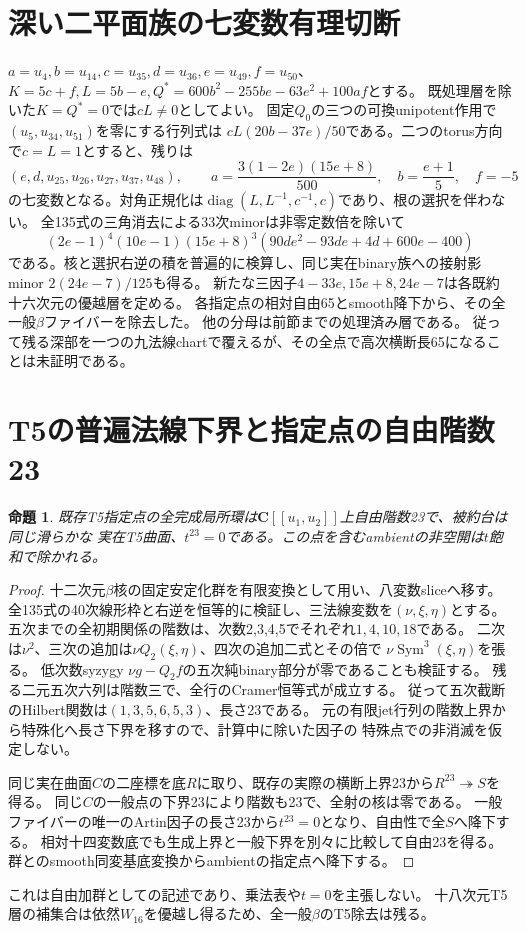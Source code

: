 \documentclass[11pt,a4paper]{ltjsarticle}
\newcommand{\CC}{\mathbf C}
\newtheorem{proposition}[theorem]{命題}
\theoremstyle{remark}
\begin{document}
\section{深い二平面族の七変数有理切断}
$a=u_4,b=u_{14},c=u_{35},d=u_{36},e=u_{49},f=u_{50}$、
$K=5c+f,L=5b-e,Q^*=600b^2-255be-63e^2+100af$とする。
既処理層を除いた$K=Q^*=0$では$cL\ne0$としてよい。
固定$Q_0$の三つの可換unipotent作用で$(u_5,u_{34},u_{51})$を零にする行列式は
$cL(20b-37e)/50$である。二つのtorus方向で$c=L=1$とすると、残りは
\[
 (e,d,u_{25},u_{26},u_{27},u_{37},u_{48}),\qquad
 a=\frac{3(1-2e)(15e+8)}{500},\quad b=\frac{e+1}{5},\quad f=-5
\]
の七変数となる。対角正規化は$\operatorname{diag}(L,L^{-1},c^{-1},c)$であり、根の選択を伴わない。
全135式の三角消去による33次minorは非零定数倍を除いて
\[
 (2e-1)^4(10e-1)(15e+8)^3
 (90de^2-93de+4d+600e-400)
\]
である。核と選択右逆の積を普遍的に検算し、同じ実在binary族への接射影minor
$2(24e-7)/125$も得る。
新たな三因子$4-33e,15e+8,24e-7$は各既約十六次元の優越層を定める。
各指定点の相対自由65とsmooth降下から、その全一般$\beta$ファイバーを除去した。
他の分母は前節までの処理済み層である\cite{deeper-chart-v42}。
従って残る深部を一つの九法線chartで覆えるが、その全点で高次横断長65になることは未証明である。

\newpage
\section{T5の普遍法線下界と指定点の自由階数23}
\begin{proposition}
既存T5指定点の全完成局所環は$\CC[[u_1,u_2]]$上自由階数23で、被約台は同じ滑らかな
実在T5曲面、$t^{23}=0$である。この点を含むambientの非空開は$t$飽和で除かれる。
\end{proposition}
\begin{proof}
十二次元$\beta$核の固定安定化群を有限変換として用い、八変数sliceへ移す。
全135式の40次線形枠と右逆を恒等的に検証し、三法線変数を$(\nu,\xi,\eta)$とする。
五次までの全初期関係の階数は、次数2,3,4,5でそれぞれ$1,4,10,18$である。
二次は$\nu^2$、三次の追加は$\nu Q_2(\xi,\eta)$、四次の追加二式とその倍で
$\nu\operatorname{Sym}^3(\xi,\eta)$を張る。
低次数syzygy $\nu g-Q_2f$の五次純binary部分が零であることも検証する。
残る二元五次六列は階数三で、全行のCramer恒等式が成立する。
従って五次截断のHilbert関数は$(1,3,5,6,5,3)$、長さ23である。
元の有限jet行列の階数上界から特殊化へ長さ下界を移すので、計算中に除いた因子の
特殊点での非消滅を仮定しない。

同じ実在曲面$C$の二座標を底$R$に取り、既存の実際の横断上界23から$R^{23}\twoheadrightarrow S$を得る。
同じ$C$の一般点の下界23により階数も23で、全射の核は零である。
一般ファイバーの唯一のArtin因子の長さ23から$t^{23}=0$となり、自由性で全$S$へ降下する。
相対十四変数底でも生成上界と一般下界を別々に比較して自由23を得る。
群とのsmooth同変基底変換からambientの指定点へ降下する\cite{t5-free-v42}。
\end{proof}
これは自由加群としての記述であり、乗法表や$t=0$を主張しない。
十八次元T5層の補集合は依然$W_{16}$を優越し得るため、全一般$\beta$のT5除去は残る。
\end{document}
